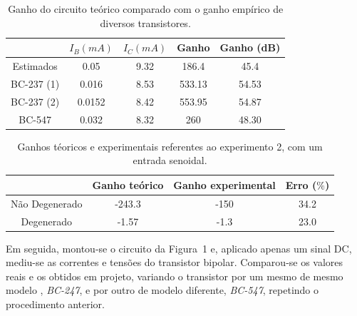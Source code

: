 \documentclass[12pt,a4paper]{article}
\begin{document}
\begin{table}[htpb]
  \centering
  \caption{Ganho do circuito teórico comparado com o ganho empírico de diversos transistores.}
  \label{tab:ganho}
  \begin{tabular}{c c c c c}
    \\ \toprule 
    & $I_{B} (mA)$ & $I_{C} (mA)$ & Ganho  & Ganho (dB) \\ \midrule
    Estimados  & 0.05         & 9.32         & 186.4  & 45.4 \\ \midrule
    BC-237 (1) & 0.016        & 8.53         & 533.13 & 54.53 \\ \midrule
    BC-237 (2) & 0.0152       & 8.42         & 553.95 & 54.87 \\ \midrule
    BC-547     & 0.032        & 8.32         & 260    & 48.30 \\ \bottomrule

  \end{tabular}
\end{table}
\begin{table}[htpb]
  \centering
  \caption{Ganhos téoricos e experimentais referentes ao experimento 2, com um 
    entrada senoidal.}
  \label{tab:Ganho}
  \begin{tabular}{c c c c}
    \\ \toprule
    & Ganho teórico & Ganho experimental& Erro ($\%$)\\ \midrule
    Não Degenerado & -243.3 & -150 & 34.2  \\ \midrule
    Degenerado & -1.57 & -1.3 & 23.0 \\ \bottomrule
  \end{tabular}
\end{table}
Em seguida, montou-se o circuito da Figura~1 e, aplicado apenas um sinal DC, 
mediu-se as correntes e tensões do transistor bipolar. 
Comparou-se os valores reais e os obtidos em projeto, variando 
o transistor por um mesmo de mesmo modelo , \emph{BC-247}, e por outro de 
modelo diferente, \emph{BC-547}, repetindo o procedimento anterior.
\end{document}
